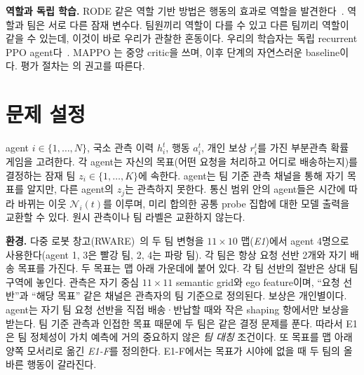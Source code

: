 \documentclass[twocolumn,10pt]{article}
\begin{document}
\textbf{역할과 독립 학습.} RODE 같은 역할 기반 방법은 행동의 효과로 역할을 발견한다~\cite{wang2021rode}. 역할과 팀은
서로 다른 잠재 변수다. 팀원끼리 역할이 다를 수 있고 다른 팀끼리 역할이 같을 수 있는데, 이것이 바로 우리가 관찰한
혼동이다. 우리의 학습자는 독립 recurrent PPO agent다~\cite{schulman2017ppo,dewitt2020ippo}. MAPPO
\cite{yu2022mappo}는 중앙 critic을 쓰며, 이후 단계의 자연스러운 baseline이다. 평가 절차는 \cite{agarwal2021precipice}의
권고를 따른다.

\section{문제 설정}
agent $i\in\{1,\dots,N\}$, 국소 관측 이력 $h_i^t$, 행동 $a_i^t$, 개인 보상 $r_i^t$를 가진 부분관측 확률 게임을 고려한다.
각 agent는 자신의 목표(어떤 요청을 처리하고 어디로 배송하는지)를 결정하는 잠재 팀 $z_i\in\{1,\dots,K\}$에 속한다.
agent는 팀 기준 관측 채널을 통해 자기 목표를 알지만, 다른 agent의 $z_j$는 관측하지 못한다. 통신 범위 안의 agent들은
시간에 따라 바뀌는 이웃 $\mathcal{N}_i(t)$를 이루며, 미리 합의한 공통 probe 집합에 대한 모델 출력을 교환할 수 있다.
원시 관측이나 팀 라벨은 교환하지 않는다.

\textbf{환경.} 다중 로봇 창고(RWARE)~\cite{papoudakis2021benchmarking}의 두 팀 변형을 $11\times10$ 맵(\emph{E1})에서
agent 4명으로 사용한다(agent 1, 3은 빨강 팀, 2, 4는 파랑 팀). 각 팀은 항상 요청 선반 2개와 자기 배송 목표를 가진다.
두 목표는 맵 아래 가운데에 붙어 있다. 각 팀 선반의 절반은 상대 팀 구역에 놓인다. 관측은 자기 중심
$11\times11$ semantic grid와 ego feature이며, ``요청 선반''과 ``해당 목표'' 같은 채널은 관측자의 팀 기준으로 정의된다.
보상은 개인별이다. agent는 자기 팀 요청 선반을 직접 배송·반납할 때와 작은 shaping 항에서만 보상을 받는다. 팀 기준
관측과 인접한 목표 때문에 두 팀은 같은 결정 문제를 푼다. 따라서 E1은 팀 정체성이 가치 예측에 거의 중요하지 않은
\emph{팀 대칭} 조건이다. 또 목표를 맵 아래 양쪽 모서리로 옮긴 \emph{E1-F}를 정의한다. E1-F에서는 목표가 시야에 없을 때
두 팀의 올바른 행동이 갈라진다.
\end{document}
